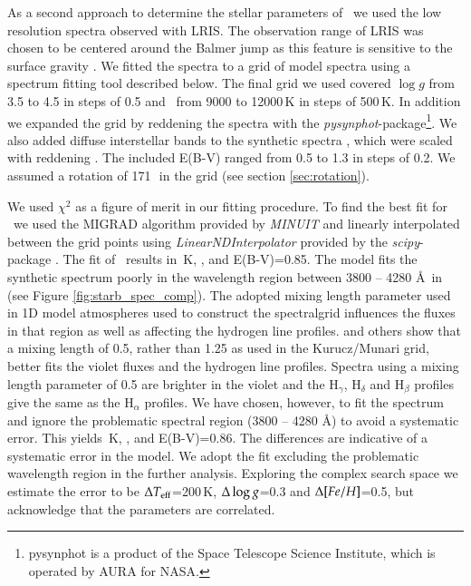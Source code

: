 As a second approach to determine the stellar parameters of \starb\ we used the low resolution spectra observed with LRIS.  The observation range of LRIS was chosen to be centered around the Balmer jump as this feature is sensitive to the surface gravity \citep{2007PASP..119..605B}. We fitted the spectra to a grid of model spectra \citep[]{2005A&A...442.1127M} using a spectrum fitting tool  described below. The final grid we used covered $\log{g}$ from 3.5 to 4.5 in steps of 0.5 and \teff\ from 9000 to 12000\,K in steps of 500\,K. In addition we expanded the grid by reddening the spectra with the \textit{pysynphot}-package\footnote{pysynphot is a product of the Space Telescope Science Institute, which is operated by AURA for NASA.}. We also added diffuse interstellar bands  \citep{1937PASP...49..224B, 1966ZA.....64..512H, 1967IAUS...31...85H, 1975ApJ...196..129H, 1995ARA&A..33...19H, 1994dib..nasa...31H, 1994A&AS..106...39J, 1958ApJ...128...57W} to the synthetic spectra , which were scaled with reddening . The included E(B-V) ranged from 0.5 to 1.3 in steps of 0.2. We assumed a rotation of 171\,\kms\ in the grid  (see section \ref{sec:rotation}).

We used $\chi^2$ as a figure of merit in our fitting procedure. To find the best fit for \starb\ we used the MIGRAD algorithm provided by \textit{MINUIT} \citep{James:1975dr} and linearly interpolated between the grid points using \textit{LinearNDInterpolator} provided by the \textit{scipy}-package  \cite{Jones:2001fk}. The fit of \starb\ results in \,\textrm{K}, ,  and E(B-V)=0.85. The model fits the synthetic spectrum poorly  in the wavelength region between 3800 -- 4280 \AA\ in (see Figure \ref{fig:starb_spec_comp}). The adopted mixing length parameter used in 1D model atmospheres used to construct the spectralgrid influences the fluxes in that region as well as affecting the hydrogen line profiles. \citet{2002A&A...392..619H} and others show that a mixing length of 0.5, rather than 1.25 as used in the Kurucz/Munari grid, better fits the violet fluxes and the hydrogen line profiles. Spectra using a mixing length parameter of 0.5 are brighter in the violet and the $\textrm{H}_\gamma$, $\textrm{H}_\delta$ and $\textrm{H}_\beta$ profiles give the same \teff as the $\textrm{H}_\alpha$ profiles. We have chosen, however, to fit the spectrum and ignore the problematic spectral region (3800 -- 4280 \AA) to avoid a systematic error. This yields \,K, ,  and E(B-V)=0.86. The differences are indicative of a systematic error in the model. We adopt the fit excluding the problematic wavelength region in the further analysis. Exploring the complex search space we estimate the error to be $\Delta T_{\rm eff}$=200\,K, $\Delta\log{g}$=0.3 and $\Delta[Fe/H]$=0.5, but acknowledge that the parameters are correlated.  



